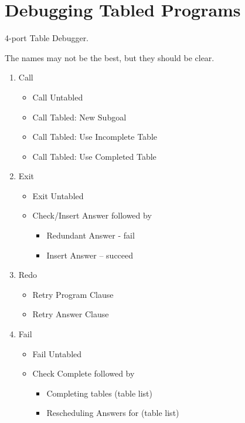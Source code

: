 \chapter{Debugging Tabled Programs}

4-port Table Debugger.

The names may not be the best, but they should be clear.

\begin{enumerate}
\item Call
\begin{itemize}
	\item Call Untabled
 
	\item Call Tabled: New Subgoal

	\item Call Tabled: Use Incomplete Table

	\item Call Tabled: Use Completed Table
\end{itemize}
\item Exit
\begin{itemize}
	\item Exit Untabled
	\item Check/Insert Answer followed by
\begin{itemize}
		\item Redundant Answer - fail 
		\item Insert Answer -- succeed
\end{itemize}
\end{itemize}

\item Redo 
\begin{itemize}
	\item Retry Program Clause
	\item Retry Answer Clause
\end{itemize}

\item Fail 
\begin{itemize}
\item Fail Untabled
\item Check Complete followed by
\begin{itemize}
\item Completing tables (table list)
\item Rescheduling Answers for (table list)
\end{itemize}
\end{itemize}
\end{enumerate}

